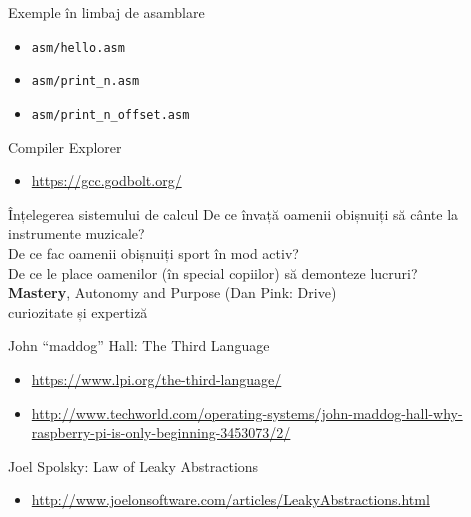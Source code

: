 \documentclass{beamer}
\begin{document}
\begin{frame}{Exemple în limbaj de asamblare}
  \begin{itemize}
    \item \texttt{asm/hello.asm}
    \item \texttt{asm/print\_n.asm}
    \item \texttt{asm/print\_n\_offset.asm}
  \end{itemize}
\end{frame}

\begin{frame}{Compiler Explorer}
  \begin{itemize}
    \item \url{https://gcc.godbolt.org/}
  \end{itemize}
\end{frame}

\begin{frame}{Înțelegerea sistemului de calcul}
  \centering
  \pause De ce învață oamenii obișnuiți să cânte la instrumente muzicale? \\
  \pause De ce fac oamenii obișnuiți sport în mod activ? \\
  \pause De ce le place oamenilor (în special copiilor) să demonteze lucruri? \\
  \vspace{5mm}
  \pause \textbf{Mastery}, Autonomy and Purpose (Dan Pink: Drive)\\
  \vspace{5mm}
  \pause curiozitate și expertiză
\end{frame}

\begin{frame}{John ``maddog'' Hall: The Third Language}
  \begin{itemize}
    \item \footnotesize{\url{https://www.lpi.org/the-third-language/}}
    \item \footnotesize{\url{http://www.techworld.com/operating-systems/john-maddog-hall-why-raspberry-pi-is-only-beginning-3453073/2/}}
  \end{itemize}
\end{frame}

\begin{frame}{Joel Spolsky: Law of Leaky Abstractions}
  \begin{itemize}
    \item \footnotesize{\url{http://www.joelonsoftware.com/articles/LeakyAbstractions.html}}
  \end{itemize}
\end{frame}
\end{document}
